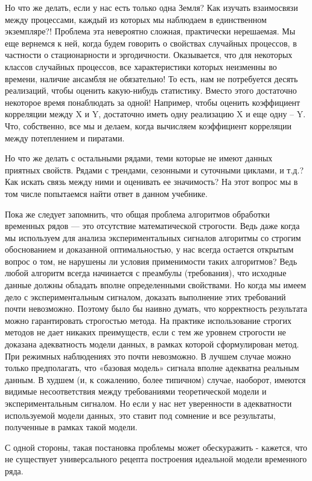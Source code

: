 Но что же делать, если у нас есть только одна Земля? Как изучать
взаимосвязи между процессами, каждый из которых мы наблюдаем в
единственном экземпляре?! Проблема эта невероятно сложная,
практически нерешаемая. Мы еще вернемся к ней, когда будем говорить
о свойствах случайных процессов, в частности о стационарности и эргодичности.
Оказывается, что для некоторых классов случайных
процессов, все характеристики которых неизменны во времени, наличие
ансамбля не обязательно! То есть, нам не потребуется десять
реализаций, чтобы оценить какую-нибудь статистику. Вместо этого
достаточно некоторое время понаблюдать за одной! Например, чтобы
оценить коэффициент корреляции между X и Y, достаточно иметь одну
реализацию X и еще одну – Y. Что, собственно, все мы и делаем,
когда вычисляем коэффициент корреляции между потеплением и
пиратами.

Но что же делать с остальными рядами, теми которые не имеют данных
приятных свойств. Рядами с трендами, сезонными и суточными
циклами, и т.д.? Как искать связь между ними и оценивать ее
значимость? На этот вопрос мы в том числе попытаемся найти ответ в
данном учебнике.

Пока же следует запомнить, что общая проблема алгоритмов обработки
временных рядов — это отсутствие математической строгости. Ведь даже когда
мы используем для анализа экспериментальных сигналов алгоритмы со
строгим обоснованием и доказанной оптимальностью, у нас всегда
остается открытым вопрос о том, не нарушены ли условия применимости
таких алгоритмов? Ведь любой алгоритм всегда начинается с преамбулы
(требования), что исходные данные должны обладать вполне
определенными свойствами. Но когда мы имеем дело с
экспериментальным сигналом, доказать выполнение этих требований
почти невозможно. Поэтому было бы наивно думать, что корректность
результата можно гарантировать строгостью метода. На практике
использование строгих методов не дает никаких преимуществ, если с
тем же уровнем строгости не доказана адекватность модели данных, в
рамках которой сформулирован метод. При режимных наблюдениях это
почти невозможно. В лучшем случае можно только предполагать, что
«базовая модель» сигнала вполне адекватна реальным данным. В худшем
(и, к сожалению, более типичном) случае, наоборот, имеются видимые
несоответствия между требованиями теоретической модели и
экспериментальным сигналом. Но если у нас нет уверенности в
адекватности используемой модели данных, это ставит под сомнение и
все результаты, полученные в рамках такой модели.

С одной стороны, такая постановка проблемы может обескуражить -
кажется, что не существует универсального рецепта построения
идеальной модели временного ряда.

